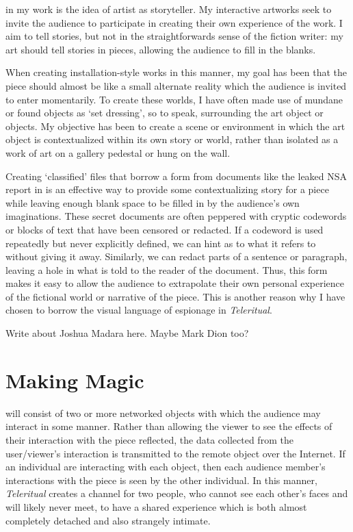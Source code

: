 \documentclass[a4paper,nobib]{tufte-handout}
\begin{document}
 in my work is the idea of artist as storyteller. My interactive artworks seek to invite the audience to participate in creating their own experience of the work. I aim to tell stories, but not in the straightforwards sense of the fiction writer: my art should tell stories in pieces, allowing the audience to fill in the blanks.

When creating installation-style works in this manner, my goal has been that the piece should almost be like a small alternate reality which the audience is invited to enter momentarily. To create these worlds, I have often made use of mundane or found objects as `set dressing', so to speak, surrounding the art object or objects. My objective has been to create a scene or environment in which the art object is contextualized within its own story or world, rather than isolated as a work of art on a gallery pedestal or hung on the wall.

Creating `classified' files that borrow a form from documents like the leaked NSA report in  is an effective way to provide some contextualizing story for a piece while leaving enough blank space to be filled in by the audience's own imaginations. These secret documents are often peppered with cryptic codewords or blocks of text that have been censored or redacted. If a codeword is used repeatedly but never explicitly defined, we can hint as to what it refers to without giving it away. Similarly, we can redact parts of a sentence or paragraph, leaving a hole in what is told to the reader of the document. Thus, this form makes it easy to allow the audience to extrapolate their own personal experience of the fictional world or narrative of the piece. This is another reason why I have chosen to borrow the visual language of espionage in \emph{Teleritual}.

Write about Joshua Madara here\autocite{madara,madarabeing,madaramagic}. Maybe Mark Dion too?


\section{Making Magic}

 will consist of two or more networked objects with which the audience may interact in some manner. Rather than allowing the viewer to see the effects of their interaction with the piece reflected, the data collected from the user/viewer's interaction is transmitted to the remote object over the Internet. If an individual are interacting with each object, then each audience member's interactions with the piece is seen by the other individual. In this manner, \emph{Teleritual} creates a channel for two people, who cannot see each other's faces and will likely never meet, to have a shared experience which is both almost completely detached and also strangely intimate.
\end{document}
